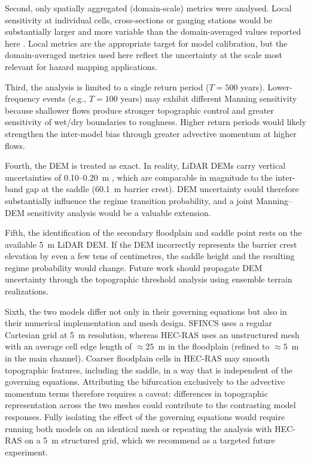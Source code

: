 \documentclass[review,12pt]{elsarticle}
\newcommand{\sfincs}{\textsc{SFINCS}}
\newcommand{\hecras}{\textsc{HEC-RAS}}
\begin{document}
Second, only spatially aggregated (domain-scale) metrics were analysed.
Local sensitivity at individual cells, cross-sections or gauging stations
would be substantially larger and more variable than the domain-averaged
values reported here \citep{pappenberger2005, cook2009}.
Local metrics are the appropriate target for model calibration, but the
domain-averaged metrics used here reflect the uncertainty at the scale most
relevant for hazard mapping applications.

Third, the analysis is limited to a single return period ($T = 500$ years).
Lower-frequency events (e.g., $T = 100$ years) may exhibit different
Manning sensitivity because shallower flows produce stronger topographic
control and greater sensitivity of wet/dry boundaries to roughness.
Higher return periods would likely strengthen the inter-model bias through
greater advective momentum at higher flows.

Fourth, the DEM is treated as exact. In reality, LiDAR DEMs carry vertical
uncertainties of 0.10--0.20~m \citep{merwade2008}, which are comparable in
magnitude to the inter-band gap at the saddle (60.1~m barrier crest).
DEM uncertainty could therefore substantially influence the regime transition
probability, and a joint Manning--DEM sensitivity analysis would be a
valuable extension.

Fifth, the identification of the secondary floodplain and saddle point rests
on the available 5~m LiDAR DEM.
If the DEM incorrectly represents the barrier crest elevation by even a
few tens of centimetres, the saddle height and the resulting regime
probability would change.
Future work should propagate DEM uncertainty through the topographic
threshold analysis using ensemble terrain realizations.

Sixth, the two models differ not only in their governing equations but also
in their numerical implementation and mesh design.
\sfincs{} uses a regular Cartesian grid at 5~m resolution, whereas \hecras{}
uses an unstructured mesh with an average cell edge length of $\approx 25$~m
in the floodplain (refined to $\approx 5$~m in the main channel).
Coarser floodplain cells in \hecras{} may smooth topographic features, including
the saddle, in a way that is independent of the governing equations.
Attributing the bifurcation exclusively to the advective momentum terms
therefore requires a caveat: differences in topographic representation across
the two meshes could contribute to the contrasting model responses.
Fully isolating the effect of the governing equations would require running
both models on an identical mesh or repeating the analysis with \hecras{} on
a 5~m structured grid, which we recommend as a targeted future experiment.
\end{document}
